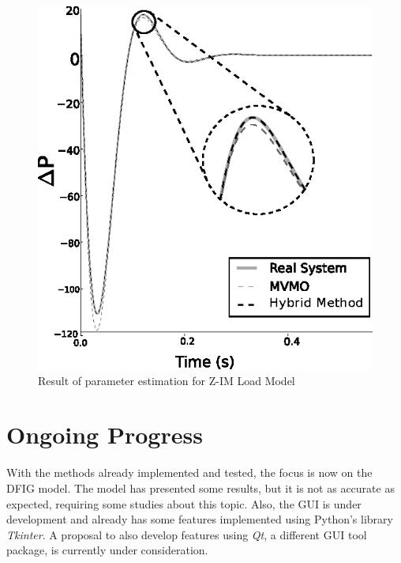 \begin{figure}[h]
	\caption{Result of parameter estimation for Z-IM Load Model}
	\begin{center}
		\includegraphics[scale=1]{Images/ZIM.eps}
	\end{center}
	\label{fig: ZIM}
\end{figure}

\section{Ongoing Progress}

With the methods already implemented and tested, the focus is now on the DFIG model. The model has presented some results, but it is not as accurate as expected, requiring some studies about this topic. Also, the GUI is under development and already has some features implemented using Python's library \textit{Tkinter}. A proposal to also develop features using \textit{Qt}, a different GUI tool package, is currently under consideration.